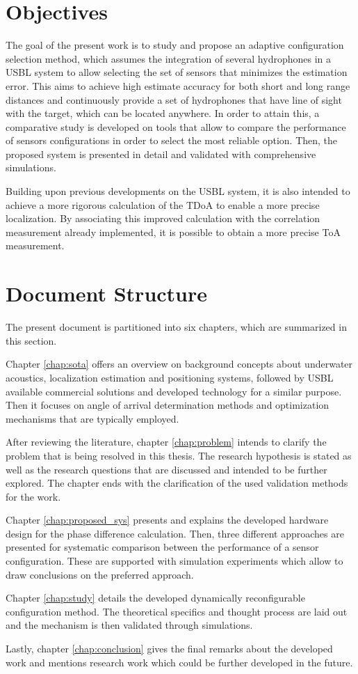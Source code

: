 \section{Objectives} \label{sec:objective}

The goal of the present work is to study and propose an adaptive configuration selection method, which assumes the integration of several hydrophones in a USBL system to allow selecting the set of sensors that minimizes the estimation error. This aims to achieve high estimate accuracy for both short and long range distances and continuously provide a set of hydrophones that have line of sight with the target, which can be located anywhere. In order to attain this, a comparative study is developed on tools that allow to compare the performance of sensors configurations in order to select the most reliable option. Then, the proposed system is presented in detail and validated with comprehensive simulations.

Building upon previous developments on the USBL system, it is also intended to achieve a more rigorous calculation of the TDoA to enable a more precise localization. By associating this improved calculation with the correlation measurement already implemented, it is possible to obtain a more precise ToA measurement. 

\section{Document Structure}

The present document is partitioned into six chapters, which are summarized in this section.

Chapter \ref{chap:sota} offers an overview on background concepts about underwater acoustics, localization estimation and positioning systems, followed by USBL available commercial solutions and developed technology for a similar purpose. Then it focuses on angle of arrival determination methods and optimization mechanisms that are typically employed.

After reviewing the literature, chapter \ref{chap:problem} intends to clarify the problem that is being resolved in this thesis. The research hypothesis is stated as well as the research questions that are discussed and intended to be further explored. The chapter ends with the clarification of the used validation methods for the work. 

Chapter \ref{chap:proposed_sys} presents and explains the developed hardware design for the phase difference calculation. Then, three different approaches are presented for systematic comparison between the performance of a sensor configuration. These are supported with simulation experiments which allow to draw conclusions on the preferred approach.

Chapter \ref{chap:study} details the developed dynamically reconfigurable configuration method. The theoretical specifics and thought process are laid out and the mechanism is then validated through simulations.

Lastly, chapter \ref{chap:conclusion} gives the final remarks about the developed work and mentions research work which could be further developed in the future.  
